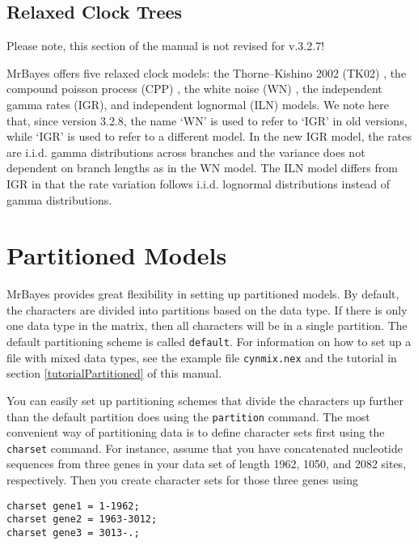 \documentclass[12pt]{book}
\begin{document}
\subsection{Relaxed Clock Trees}

{\large\color{red} Please note, this section of the manual is not revised for v.3.2.7!}

MrBayes offers five relaxed clock models: the Thorne--Kishino 2002 (TK02) \citep{thorne02}, the
compound poisson process (CPP) \citep{huelsenbeck00a}, the white noise (WN) \citep{lepage07}, the
independent gamma rates (IGR), and independent lognormal (ILN) \citep{drummond06} models. We note
here that, since version 3.2.8, the name `WN' is used to refer to `IGR' in old versions, while
`IGR' is used to refer to a different model. In the new IGR model, the rates are i.i.d. gamma
distributions across branches and the variance does not dependent on branch lengths as in the WN
model. The ILN model differs from IGR in that the rate variation follows i.i.d. lognormal
distributions instead of gamma distributions.


\section{Partitioned Models}
\label{partitionedModels}

MrBayes provides great flexibility in setting up partitioned models. By default, the characters are
divided into partitions based on the data type. If there is only one data type in the matrix, then
all characters will be in a single partition. The default partitioning scheme is called
\texttt{default}. For information on how to set up a file with mixed data types, see the example
file \texttt{cynmix.nex} and the tutorial in section \ref{tutorialPartitioned} of this manual.

You can easily set up partitioning schemes that divide the characters up further than the default
partition does using the \texttt{partition} command. The most convenient way of partitioning data
is to define character sets first using the \texttt{charset} command. For instance, assume that you
have concatenated nucleotide sequences from three genes in your data set of length 1962, 1050, and
2082 sites, respectively. Then you create character sets for those three genes using

\begin{Verbatim}
charset gene1 = 1-1962;
charset gene2 = 1963-3012;
charset gene3 = 3013-.;
\end{Verbatim}
\end{document}
